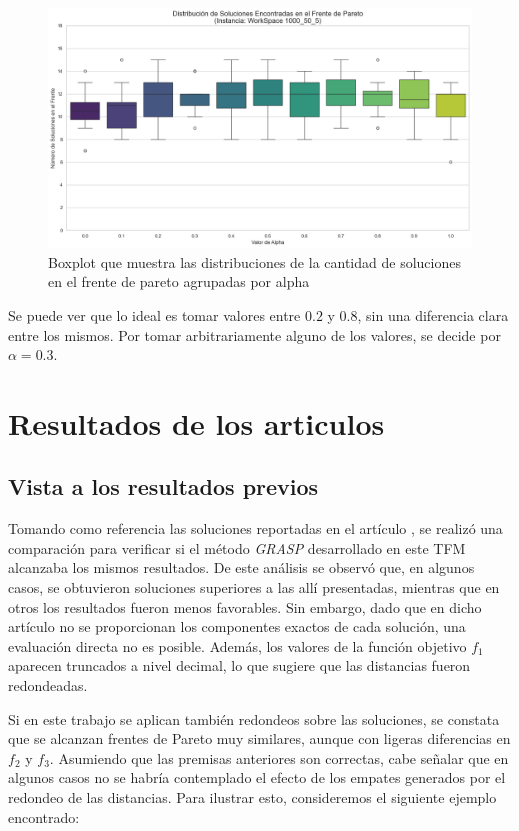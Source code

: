 \documentclass[12pt,a4paper]{book}
\begin{document}
\begin{figure}[H]
    \centering
    \includegraphics[width=\linewidth]{images_finetuning/alpha_20_100}
    \caption{Boxplot que muestra las distribuciones de la cantidad de soluciones en el frente de pareto agrupadas por alpha}
    \label{fig:alpha}
\end{figure}

Se puede ver que lo ideal es tomar valores entre $0.2$ y $0.8$, sin una diferencia clara entre los mismos. Por tomar arbitrariamente alguno de los valores, se decide por $\alpha=0.3$.

\section{Resultados de los articulos}

\subsection{Vista a los resultados previos}
\label{sec:articulo2}
Tomando como referencia las soluciones reportadas en el artículo \cite{k-Balanced_2}, se realizó una comparación para verificar si el método \textit{GRASP} desarrollado en este TFM alcanzaba los mismos resultados. De este análisis se observó que, en algunos casos, se obtuvieron soluciones superiores a las allí presentadas, mientras que en otros los resultados fueron menos favorables.
Sin embargo, dado que en dicho artículo no se proporcionan los componentes exactos de cada solución, una evaluación directa no es posible. 
Además, los valores de la función objetivo $f_1$ aparecen truncados a nivel decimal, lo que sugiere que las distancias fueron redondeadas.

Si en este trabajo se aplican también redondeos sobre las soluciones, se constata que se alcanzan frentes de Pareto muy similares, aunque con ligeras diferencias en $f_2$ y $f_3$. Asumiendo que las premisas anteriores son correctas, cabe señalar que en algunos casos no se habría contemplado el efecto de los empates generados por el redondeo de las distancias. Para ilustrar esto, consideremos el siguiente ejemplo encontrado:
\end{document}
